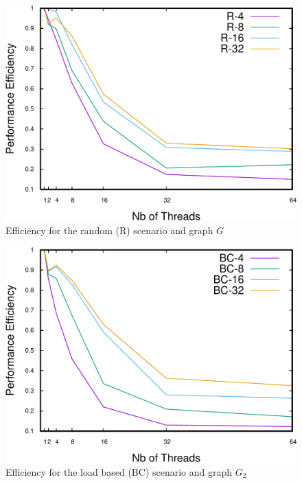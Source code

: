 \begin{figure}
\centering
\includegraphics[scale=0.35]{bench/generated/efficiency-r-1-crop.pdf}
\caption{Efficiency for the random (R) scenario and graph $G$}
\label{fig:effr1}
\end{figure}

\begin{figure}
\centering
\includegraphics[scale=0.35]{bench/generated/efficiency-bc-2-crop.pdf}
\caption{Efficiency for the load based (BC) scenario and graph $G_2$}
\label{fig:effbc2}
\end{figure}


